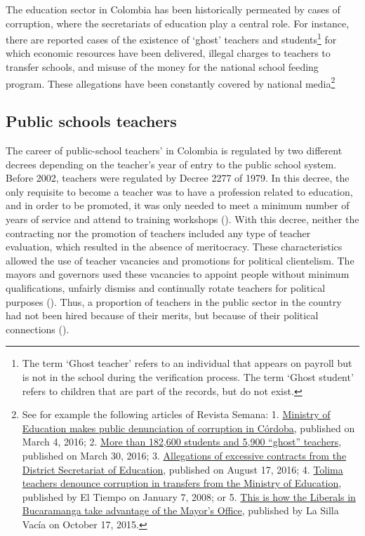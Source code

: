 \documentclass[12pt,runningheads]{article}
\begin{document}
The education sector in Colombia has been historically permeated by cases of corruption, where the secretariats of education play a central role. For instance, there are reported cases of the existence of ‘ghost’ teachers and students\footnote{The term ‘Ghost teacher’  refers to an individual that appears on payroll but is not in the school during the verification process. The term ‘Ghost student’ refers to children that are part of the records, but do not exist.} for which economic resources have been delivered, illegal charges to teachers to transfer schools, and misuse of the money for the national school feeding program. These allegations have been constantly covered by national media\footnote{See for example the following articles of Revista Semana: 1. \href{https://www.semana.com/educacion/articulo/gina-parody-denuncia-corrupcion-en-cordoba-y-norte-de-santander-colombia/464029/}{Ministry of Education makes public denunciation of corruption in Córdoba}, published on March 4, 2016; 2.  \href{https://www.semana.com/educacion/articulo/ministerio-de-educacion-denuncia-altos-numeros-de-estudiantes-y-docentes-inexistentes/467265/}{More than 182,600 students and 5,900 “ghost” teachers}, published on March 30, 2016; 3. \href{https://www.semana.com/educacion/articulo/denuncian-exceso-de-contratos-de-la-secretaria-de-educacion-distrital/488235/}{Allegations of excessive contracts from the District Secretariat of Education}, published on August 17, 2016; 4. \href{https://www.eltiempo.com/archivo/documento/CMS-3911288}{Tolima teachers denounce corruption in transfers from the Ministry of Education}, published by El Tiempo on January 7, 2008; or 5. \href{https://archivo.lasillavacia.com/historia/asi-se-aprovechan-los-liberales-de-la-alcaldia-de-bucaramanga-51983}{This is how the Liberals in Bucaramanga take advantage of the Mayor’s Office}, published by La Silla Vacía on October 17, 2015.}

\subsection{Public schools teachers} 

The career of public-school teachers' in Colombia is regulated by two different decrees depending on the teacher's year of entry to the public school system. Before 2002, teachers were regulated by Decree 2277 of 1979. In this decree, the only requisite to become a teacher was to have a profession related to education, and in order to be promoted, it was only needed to meet a minimum number of years of service and attend to training workshops (). With this decree, neither the contracting nor the promotion of teachers included any type of teacher evaluation, which resulted in the absence of meritocracy. These characteristics allowed the use of teacher vacancies and promotions for political clientelism. The mayors and governors used these vacancies to appoint people without minimum qualifications, unfairly dismiss and continually rotate teachers for political purposes (). Thus, a proportion of teachers in the public sector in the country had not been hired because of their merits, but because of their political connections ().
\end{document}
